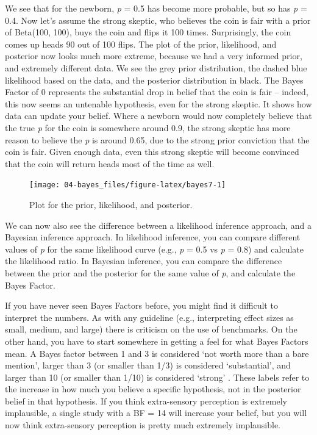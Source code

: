 \documentclass[
  oneside]{book}
\begin{document}
We see that for the newborn, \emph{p} = 0.5 has become more probable, but so has \emph{p} = 0.4. Now let's assume the strong skeptic, who believes the coin is fair with a prior of Beta(100, 100), buys the coin and flips it 100 times. Surprisingly, the coin comes up heads 90 out of 100 flips. The plot of the prior, likelihood, and posterior now looks much more extreme, because we had a very informed prior, and extremely different data. We see the grey prior distribution, the dashed blue likelihood based on the data, and the posterior distribution in black. The Bayes Factor of 0 represents the substantial drop in belief that the coin is fair -- indeed, this now seems an untenable hypothesis, even for the strong skeptic. It shows how data can update your belief. Where a newborn would now completely believe that the true \emph{p} for the coin is somewhere around 0.9, the strong skeptic has more reason to believe the \emph{p} is around 0.65, due to the strong prior conviction that the coin is fair. Given enough data, even this strong skeptic will become convinced that the coin will return heads most of the time as well.



\begin{figure}

{\centering \texttt{[image: 04-bayes\_files/figure-latex/bayes7-1]} 

}

\caption{Plot for the prior, likelihood, and posterior.}\label{fig:bayes7}
\end{figure}

We can now also see the difference between a likelihood inference approach, and a Bayesian inference approach. In likelihood inference, you can compare different values of \emph{p} for the same likelihood curve (e.g., \emph{p} = 0.5 vs \emph{p} = 0.8) and calculate the likelihood ratio. In Bayesian inference, you can compare the difference between the prior and the posterior for the same value of \emph{p}, and calculate the Bayes Factor.

If you have never seen Bayes Factors before, you might find it difficult to interpret the numbers. As with any guideline (e.g., interpreting effect sizes as small, medium, and large) there is criticism on the use of benchmarks. On the other hand, you have to start somewhere in getting a feel for what Bayes Factors mean. A Bayes factor between 1 and 3 is considered `not worth more than a bare mention', larger than 3 (or smaller than 1/3) is considered `substantial', and larger than 10 (or smaller than 1/10) is considered `strong' \citep{jeffreys_theory_1939}. These labels refer to the increase in how much you believe a specific hypothesis, not in the posterior belief in that hypothesis. If you think extra-sensory perception is extremely implausible, a single study with a BF = 14 will increase your belief, but you will now think extra-sensory perception is pretty much extremely implausible.
\end{document}

